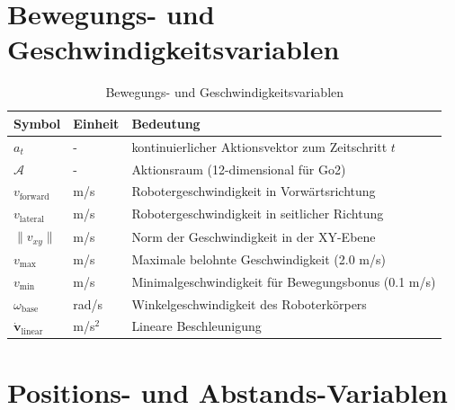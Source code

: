 \section{Bewegungs- und Geschwindigkeitsvariablen}

\begin{table}[htbp]
	\centering
	\begin{tabular}{lll}
		\toprule
		\textbf{Symbol} & \textbf{Einheit} & \textbf{Bedeutung} \\
		\midrule
		$a_t$ & - & kontinuierlicher Aktionsvektor zum Zeitschritt $t$ \\
		$\mathcal{A}$ & - & Aktionsraum (12-dimensional für Go2) \\
		$v_{\text{forward}}$ & m/s & Robotergeschwindigkeit in Vorwärtsrichtung \\
		$v_{\text{lateral}}$ & m/s & Robotergeschwindigkeit in seitlicher Richtung \\
		$\|v_{xy}\|$ & m/s & Norm der Geschwindigkeit in der XY-Ebene \\
		$v_{\text{max}}$ & m/s & Maximale belohnte Geschwindigkeit (2.0 m/s) \\
		$v_{\text{min}}$ & m/s & Minimalgeschwindigkeit für Bewegungsbonus (0.1 m/s) \\
		$\omega_{\text{base}}$ & rad/s & Winkelgeschwindigkeit des Roboterkörpers \\
		$\dot{\mathbf{v}}_{\text{linear}}$ & m/s$^2$ & Lineare Beschleunigung \\
		\bottomrule
	\end{tabular}
	\caption{Bewegungs- und Geschwindigkeitsvariablen}
	\label{tab:symbols_velocity}
\end{table}

\section{Positions- und Abstands-Variablen}

